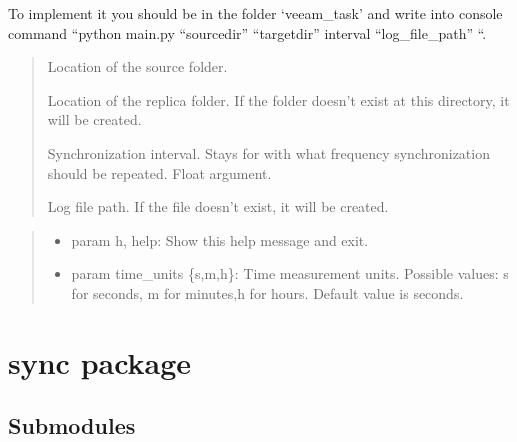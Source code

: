 \documentclass[letterpaper,10pt,english]{sphinxmanual}
\begin{document}
\sphinxAtStartPar
To implement it you should be in the folder ‘veeam\_task’ and write into console command
“python main.py “sourcedir” “targetdir” interval “log\_file\_path” “.
\begin{description}
\begin{quote}\begin{description}
\sphinxAtStartPar
Location of the source folder.

\sphinxAtStartPar
Location of the replica folder. If the folder doesn’t exist at this directory, it will be created.

\sphinxAtStartPar
Synchronization interval. Stays for with what frequency synchronization should be repeated. Float argument.

\sphinxAtStartPar
Log file path. If the file doesn’t exist, it will be created.

\end{description}\end{quote}

\end{description}
\begin{quote}\begin{description}
\begin{itemize}
\item {} 
\sphinxAtStartPar
param \sphinxhyphen{}h, \textendash{}help: Show this help message and exit.

\item {} 
\sphinxAtStartPar
param time\_units \{s,m,h\}: Time measurement units. Possible values: s for seconds, m for minutes,h for hours. Default value is seconds.

\end{itemize}

\end{description}\end{quote}

\sphinxstepscope


\section{sync package}
\label{\detokenize{sync:sync-package}}\label{\detokenize{sync::doc}}

\subsection{Submodules}
\label{\detokenize{sync:submodules}}
\end{document}
